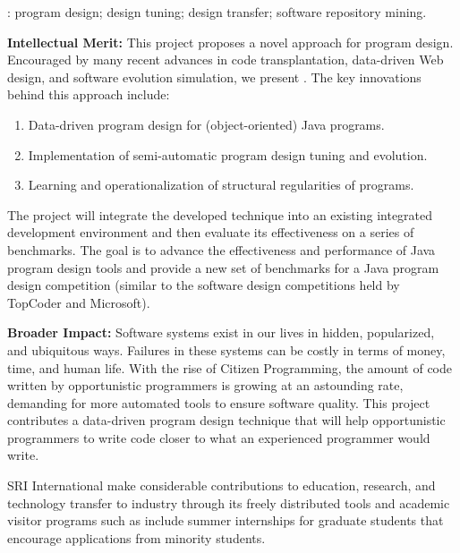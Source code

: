 \medskip{}: program design; design tuning; 
design transfer; software repository mining.   

\medskip\noindent
{\bf{Intellectual Merit:}} 
% 
This project proposes a novel approach for program design. Encouraged 
by many recent advances in code transplantation, data-driven Web design, 
and software evolution simulation, we present \pdm. The key innovations 
behind this approach include:

\begin{enumerate}
	\item Data-driven program design for (object-oriented) Java programs.
	\item Implementation of semi-automatic program design tuning and evolution.
	\item Learning and operationalization of structural regularities of programs.
\end{enumerate}

\noindent
The project will integrate the developed \pdm technique into an existing 
integrated development environment and then evaluate its effectiveness 
on a series of benchmarks. The goal is to advance the effectiveness and 
performance of Java program design tools and provide a new set of benchmarks 
for a Java program design competition (similar to the software design 
competitions held by TopCoder and Microsoft).


\medskip\noindent
{\bf{Broader Impact:}}
Software systems exist in our lives in hidden, popularized, and ubiquitous 
ways. Failures in these systems can be costly in terms of money, time, and 
human life. With the rise of Citizen Programming, the amount of code written 
by opportunistic programmers is growing at an astounding rate, demanding for 
more automated tools to ensure software quality. This project contributes a 
data-driven program design technique that will help opportunistic programmers 
to write code closer to what an experienced programmer would write. 

SRI International make considerable contributions to education, research, 
and technology transfer to industry through its freely distributed tools 
and academic visitor programs such as include summer internships for graduate 
students that encourage applications from minority students. 
